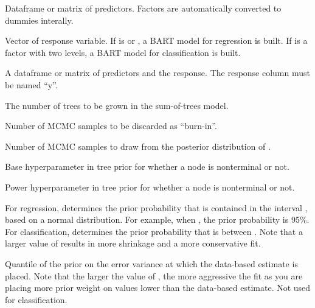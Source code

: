 \documentclass[a4paper]{book}
\begin{document}
%
\begin{Arguments}
\begin{ldescription}
\item[\code{X}] 
Dataframe or matrix of predictors. Factors are automatically converted to dummies interally. 

\item[\code{y}] 
Vector of response variable. If  is  or , a BART model for regression is built. If  is a factor with two levels, a BART model for classification is built.

\item[\code{Xy}] 
A dataframe or matrix of predictors and the response. The response column must be named ``y''. 

\item[\code{num\_trees}] 
The number of trees to be grown in the sum-of-trees model.

\item[\code{num\_burn\_in}] 
Number of MCMC samples to be discarded as ``burn-in''.

\item[\code{num\_iterations\_after\_burn\_in}] 
Number of MCMC samples to draw from the posterior distribution of . 

\item[\code{alpha}] 
Base hyperparameter in tree prior for whether a node is nonterminal or not.

\item[\code{beta}] 
Power hyperparameter in tree prior for whether a node is nonterminal or not.

\item[\code{k}] 
For regression,  determines the prior probability that  is contained in the interval , based on a normal distribution. For example, when , the prior probability is 95\%. For classification,  determines the prior probability that  is between . Note that a larger value of  results in more shrinkage and a more conservative fit. 

\item[\code{q}] 
Quantile of the prior on the error variance at which the data-based estimate is placed. Note that the larger the value of , the more aggressive the fit as you are placing more prior weight on values lower than the data-based estimate. Not used for classification.


\end{ldescription}
\end{Arguments}
\end{document}
